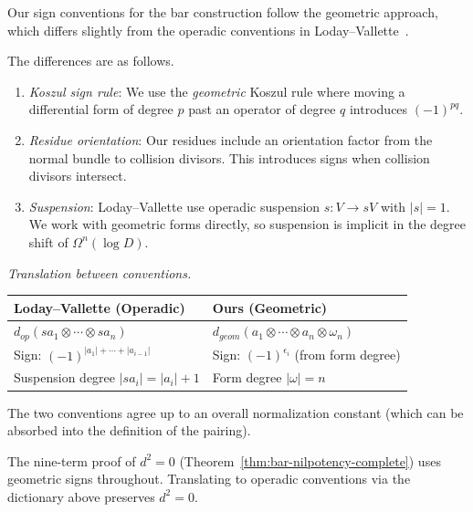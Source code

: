 \begin{remark}\label{rem:LV-signs}
Our sign conventions for the bar construction follow the geometric approach, which differs slightly from the operadic conventions in Loday--Vallette~\cite{LV12}.

The differences are as follows.
\begin{enumerate}
\item \emph{Koszul sign rule}: We use the \emph{geometric} Koszul rule where moving a differential form of degree $p$ past an operator of degree $q$ introduces $(-1)^{pq}$.

\item \emph{Residue orientation}: Our residues include an orientation factor from the normal bundle to collision divisors. This introduces signs when collision divisors intersect.

\item \emph{Suspension}: Loday--Vallette use operadic suspension $s: V \to sV$ with $|s| = 1$. We work with geometric forms directly, so suspension is implicit in the degree shift of $\Omega^n(\log D)$.
\end{enumerate}

\emph{Translation between conventions.}
\begin{center}
\begin{tabular}{|>{\raggedright\arraybackslash}p{}|>{\raggedright\arraybackslash}p{}|}
\hline
\textbf{Loday--Vallette (Operadic)} & \textbf{Ours (Geometric)} \\
\hline
$d_{op}(s a_1 \otimes \cdots \otimes s a_n)$ & $d_{geom}(a_1 \otimes \cdots \otimes a_n \otimes \omega_n)$ \\
Sign: $(-1)^{|a_1| + \cdots + |a_{i-1}|}$ & Sign: $(-1)^{\epsilon_i}$ (from form degree) \\
Suspension degree $|s a_i| = |a_i| + 1$ & Form degree $|\omega| = n$ \\
\hline
\end{tabular}
\end{center}

The two conventions agree up to an overall normalization constant (which can be absorbed into the definition of the pairing).

The nine-term proof of $d^2 = 0$ (Theorem~\ref{thm:bar-nilpotency-complete}) uses geometric signs throughout. Translating to operadic conventions via the dictionary above preserves $d^2 = 0$.
\end{remark}


